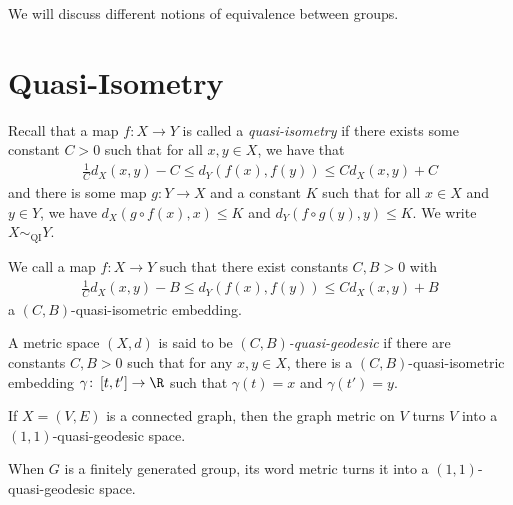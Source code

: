 \documentclass[10pt]{mypackage}
\begin{document}
\RaggedRight
We will discuss different notions of equivalence between groups.
\section{Quasi-Isometry}%
\begin{definition}
  Recall that a map $f\colon X\to Y$ is called a \textit{quasi-isometry} if there exists some constant $C > 0$ such that for all $x,y\in X$, we have that
  \begin{align*}
    \frac{1}{C}d_X\left( x,y \right)-C \leq d_Y\left( f(x),f(y) \right) \leq Cd_X\left( x,y \right) + C
  \end{align*}
  and there is some map $g\colon Y\to X$ and a constant $K$ such that for all $x\in X$ and $y\in Y$, we have $d_X\left( g\circ f(x),x \right) \leq K$ and $d_Y\left( f\circ g(y),y \right)\leq K$. We write $X\sim_{\operatorname{QI}}Y$.
\end{definition}
\begin{remark}
  We call a map $f\colon X\to Y$ such that there exist constants $C,B > 0$ with
  \begin{align*}
    \frac{1}{C}d_X\left( x,y \right)-B \leq d_Y\left( f(x),f(y) \right) \leq Cd_X\left( x,y \right) + B
  \end{align*}
  a $\left( C,B \right)$-quasi-isometric embedding.
\end{remark}
\begin{definition}
  A metric space $\left( X,d \right)$ is said to be \textit{$\left( C,B \right)$-quasi-geodesic} if there are constants $C,B > 0$ such that for any $x,y\in X$, there is a $\left( C,B \right)$-quasi-isometric embedding $\gamma\colon \left[ t,t' \right]\to \R$ such that $\gamma(t) = x$ and $\gamma(t') = y$.
\end{definition}
\begin{example}
  If $X = \left( V,E \right)$ is a connected graph, then the graph metric on $V$ turns $V$ into a $\left( 1,1 \right)$-quasi-geodesic space.

  When $G$ is a finitely generated group, its word metric turns it into a $\left( 1,1 \right)$-quasi-geodesic space.
\end{example}
\end{document}
